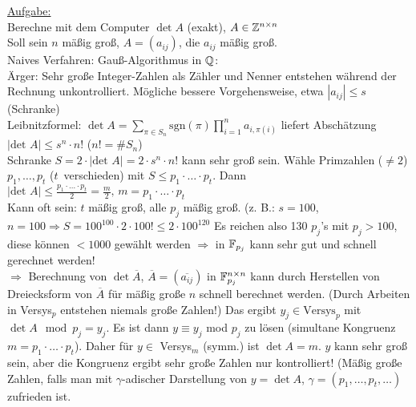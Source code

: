 \documentclass[a4paper,DIV15,BCOR12mm]{article}
\begin{document}
\underline{Aufgabe:} \\
Berechne mit dem Computer $\det A$ (exakt), $A \in \mathbb{Z}^{n \times n}$ \\
Soll sein $n$ mäßig groß, $A=(a_{ij})$, die $a_{ij}$ mäßig groß.\\
Naives Verfahren: Gauß-Algorithmus in $\mathbb{Q}$: \\
Ärger: Sehr große Integer-Zahlen als Zähler und Nenner entstehen während
der Rechnung unkontrolliert. Mögliche bessere Vorgehensweise, etwa $|a_{ij}| \leq s$
(Schranke) \\
Leibnitzformel: $\det A=\sum_{\pi \in
S_n}\text{sgn}(\pi)\prod_{i=1}^na_{i,\pi(i)}$
liefert Abschätzung $|\mbox{det }A|\leq s^n\cdot n!$ (${n! = \#S_n}$)\\
Schranke $S = 2\cdot|\mbox{det }A| = 2 \cdot s^n\cdot n!$ kann sehr
groß sein. Wähle Primzahlen ($\neq 2$) $p_1,\dotsc,p_t$
($t$~verschieden) mit $S \leq p_1\cdot \dotsc \cdot p_t$. Dann
$|\mbox{det }A| \leq \frac{p_1\cdot \dotsc \cdot p_t}{2} = \frac{m}{2}\mbox{, }m=p_1\cdot \dotsc \cdot p_t$\\
Kann oft sein: $t$ mäßig groß, alle $p_j$ mäßig groß. (z. B.:
$s=100$, $n=100 \Rightarrow S = 100^{100}\cdot 2 \cdot 100! \leq 2 \cdot 100^{120}$
Es reichen also 130 $p_j$'s mit $p_j > 100$, diese können $< 1000$ gewählt werden
$\Rightarrow$ in $\mathbb{F}_{p_j}$ kann sehr gut und schnell gerechnet werden!\\
$\Rightarrow$ Berechnung von $\det \overline{A}$, $\overline{A} =
(\overline{a_{ij}})$ in $\mathbb{F}_{p_j}^{n \times n}$ kann durch
Herstellen von Dreiecksform von $\overline{A}$ für mäßig große $n$
schnell berechnet werden. (Durch Arbeiten in Versys$_p$ entstehen
niemals große Zahlen!) Das ergibt $y_j \in \mbox{Versys}_p$ mit
$\det A \mod p_j = y_j$. Es ist dann $y \equiv y_j$ mod $p_j$ zu
lösen (simultane Kongruenz $m=p_1\cdot \dotsc \cdot p_t$). Daher für
$y \in$ Versys$_m$ (symm.) ist $\det A=m$. $y$ kann sehr groß sein,
aber die Kongruenz ergibt sehr große Zahlen nur kontrolliert! (Mäßig
große Zahlen, falls man mit $\gamma$-adischer Darstellung von
$y=\det A$, $\gamma=(p_1,\dotsc,p_t,\dotsc)$ zufrieden ist.
\end{document}
